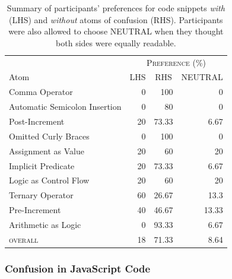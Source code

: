 \begin{table}[!htb]
    \centering
    \caption{Summary of participants' preferences for code snippets \emph{with} (LHS) and
      \emph{without} atoms of confusion (RHS).
      Participants were also allowed to choose NEUTRAL when they thought both sides were equally readable.}
    \begin{tabular}{lrrr}\toprule
      & \multicolumn{3}{c}{\textsc{Preference (\%)}} \\
      \cmidrule(lr){2-4}
         Atom           & \multicolumn{1}{c}{\textsc{LHS}}
                                      &  \multicolumn{1}{c}{\textsc{RHS}}
                                               & \multicolumn{1}{c}{NEUTRAL} \\ \midrule
         Comma Operator                  & 0  & 100    & 0     \\
         Automatic Semicolon Insertion  & 0  & 80     & 0     \\
         Post-Increment                  & 20 & 73.33  & 6.67  \\
         Omitted Curly Braces            & 0  & 100    & 0     \\
         Assignment as Value             & 20 & 60     & 20    \\
         Implicit Predicate              & 20 & 73.33  & 6.67  \\
         Logic as Control Flow           & 20 & 60     & 20    \\
         Ternary Operator                & 60 & 26.67  & 13.3  \\
         Pre-Increment                   & 40 & 46.67  & 13.33 \\ 
         Arithmetic as Logic             & 0  & 93.33  & 6.67  \\ \midrule
         \textsc{overall}                & 18 & 71.33  & 8.64  \\
         \bottomrule
    \end{tabular}
    \label{tab:interview-results1}
\end{table}


\subsubsection*{Confusion in JavaScript Code} 


